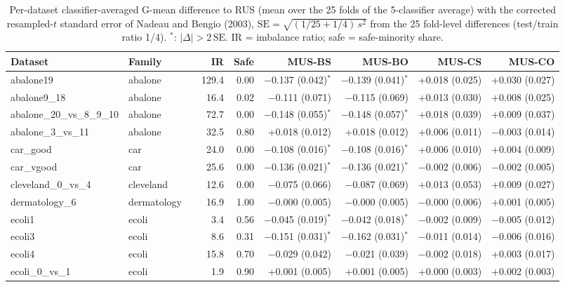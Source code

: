 \begin{table}[!htbp]
\centering
\caption{Per-dataset classifier-averaged G-mean difference to RUS (mean over the 25 folds of the 5-classifier average) with the corrected resampled-$t$ standard error of Nadeau and Bengio (2003), $\mathrm{SE}=\sqrt{(1/25+1/4)\,s^2}$ from the 25 fold-level differences (test/train ratio 1/4). $^{*}$: $|\Delta|>2\,\mathrm{SE}$. IR = imbalance ratio; safe = safe-minority share.}
\label{tab:a6_per_dataset}
\scriptsize
\setlength{\tabcolsep}{3pt}
\begin{tabular}{lllrrrrrr}
\toprule
Dataset & Family & & IR & Safe & MUS-BS & MUS-BO & MUS-CS & MUS-CO \\
\midrule
abalone19 & abalone &  & 129.4 & 0.00 & $-$0.137 (0.042)$^{*}$ & $-$0.139 (0.041)$^{*}$ & +0.018 (0.025) & +0.030 (0.027) \\
abalone9\_18 & abalone &  & 16.4 & 0.02 & $-$0.111 (0.071) & $-$0.115 (0.069) & +0.013 (0.030) & +0.008 (0.025) \\
abalone\_20\_vs\_8\_9\_10 & abalone &  & 72.7 & 0.00 & $-$0.148 (0.055)$^{*}$ & $-$0.148 (0.057)$^{*}$ & +0.018 (0.039) & +0.009 (0.037) \\
abalone\_3\_vs\_11 & abalone &  & 32.5 & 0.80 & +0.018 (0.012) & +0.018 (0.012) & +0.006 (0.011) & $-$0.003 (0.014) \\
car\_good & car &  & 24.0 & 0.00 & $-$0.108 (0.016)$^{*}$ & $-$0.108 (0.016)$^{*}$ & +0.006 (0.010) & +0.004 (0.009) \\
car\_vgood & car &  & 25.6 & 0.00 & $-$0.136 (0.021)$^{*}$ & $-$0.136 (0.021)$^{*}$ & $-$0.002 (0.006) & $-$0.002 (0.005) \\
cleveland\_0\_vs\_4 & cleveland &  & 12.6 & 0.00 & $-$0.075 (0.066) & $-$0.087 (0.069) & +0.013 (0.053) & +0.009 (0.027) \\
dermatology\_6 & dermatology &  & 16.9 & 1.00 & $-$0.000 (0.005) & $-$0.000 (0.005) & $-$0.000 (0.006) & +0.001 (0.005) \\
ecoli1 & ecoli &  & 3.4 & 0.56 & $-$0.045 (0.019)$^{*}$ & $-$0.042 (0.018)$^{*}$ & $-$0.002 (0.009) & $-$0.005 (0.012) \\
ecoli3 & ecoli &  & 8.6 & 0.31 & $-$0.151 (0.031)$^{*}$ & $-$0.162 (0.031)$^{*}$ & $-$0.011 (0.014) & $-$0.006 (0.016) \\
ecoli4 & ecoli &  & 15.8 & 0.70 & $-$0.029 (0.042) & $-$0.021 (0.039) & $-$0.002 (0.018) & +0.003 (0.017) \\
ecoli\_0\_vs\_1 & ecoli &  & 1.9 & 0.90 & +0.001 (0.005) & +0.001 (0.005) & +0.000 (0.003) & +0.002 (0.003) \\

\end{tabular}
\end{table}
